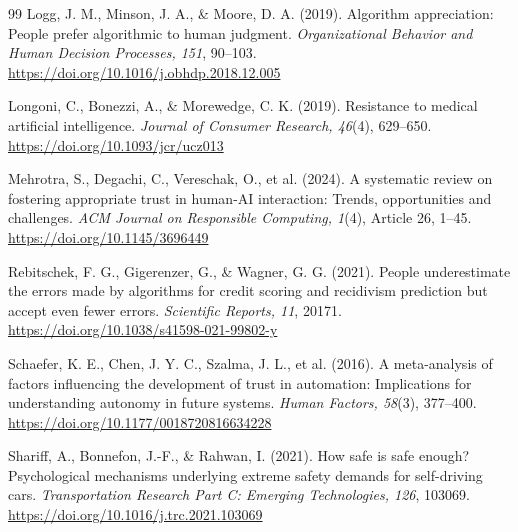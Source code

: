 \documentclass[11pt,a4paper]{article}
\begin{document}
\begin{thebibliography}{99}
Logg, J. M., Minson, J. A., \& Moore, D. A. (2019). Algorithm appreciation: People prefer algorithmic to human judgment. \textit{Organizational Behavior and Human Decision Processes, 151}, 90--103. \url{https://doi.org/10.1016/j.obhdp.2018.12.005}

Longoni, C., Bonezzi, A., \& Morewedge, C. K. (2019). Resistance to medical artificial intelligence. \textit{Journal of Consumer Research, 46}(4), 629--650. \url{https://doi.org/10.1093/jcr/ucz013}

Mehrotra, S., Degachi, C., Vereschak, O., et al. (2024). A systematic review on fostering appropriate trust in human-AI interaction: Trends, opportunities and challenges. \textit{ACM Journal on Responsible Computing, 1}(4), Article 26, 1--45. \url{https://doi.org/10.1145/3696449}

Rebitschek, F. G., Gigerenzer, G., \& Wagner, G. G. (2021). People underestimate the errors made by algorithms for credit scoring and recidivism prediction but accept even fewer errors. \textit{Scientific Reports, 11}, 20171. \url{https://doi.org/10.1038/s41598-021-99802-y}

Schaefer, K. E., Chen, J. Y. C., Szalma, J. L., et al. (2016). A meta-analysis of factors influencing the development of trust in automation: Implications for understanding autonomy in future systems. \textit{Human Factors, 58}(3), 377--400. \url{https://doi.org/10.1177/0018720816634228}

Shariff, A., Bonnefon, J.-F., \& Rahwan, I. (2021). How safe is safe enough? Psychological mechanisms underlying extreme safety demands for self-driving cars. \textit{Transportation Research Part C: Emerging Technologies, 126}, 103069. \url{https://doi.org/10.1016/j.trc.2021.103069}

\end{thebibliography}
\endgroup
\end{document}
